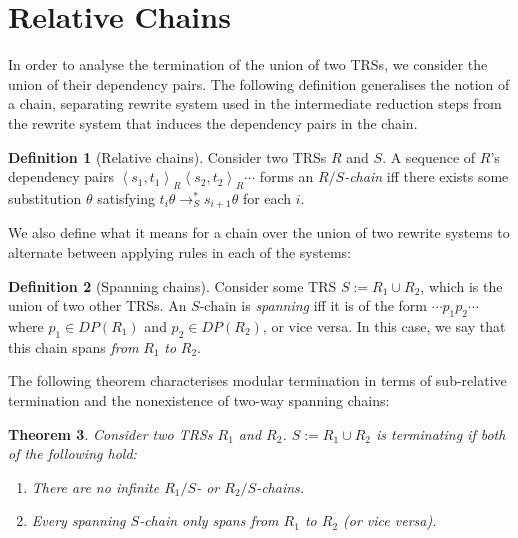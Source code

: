 \documentclass{article}
\newtheorem{theorem}{Theorem}%
\theoremstyle{definition}
\newtheorem{definition}[theorem]{Definition}
\newcommand{\dpair}[2]{\left\langle #1, #2 \right\rangle}
\begin{document}
\section{Relative Chains}

In order to analyse the termination of the union of two TRSs, we consider the union of their dependency pairs. The following definition generalises the notion of a chain, separating rewrite system used in the intermediate reduction steps from the rewrite system that induces the dependency pairs in the chain.

\begin{definition}[Relative chains]
    Consider two TRSs $R$ and $S$. A sequence of $R$'s dependency pairs $\dpair{s_1}{t_1}_R \dpair{s_2}{t_2}_R \cdots$ forms an \emph{$R/S$-chain} iff there exists some substitution $\theta$ satisfying $t_i \theta \rightarrow^*_S s_{i+1}\theta$ for each $i$. 
\end{definition}

We also define what it means for a chain over the union of two rewrite systems to alternate between applying rules in each of the systems:
\begin{definition}[Spanning chains]
    Consider some TRS $S := R_1 \cup R_2$, which is the union of two other TRSs. An $S$-chain is \emph{spanning} iff it is of the form $\cdots p_1 p_2 \cdots$ where $p_1 \in DP(R_1)$ and $p_2 \in DP(R_2)$, or vice versa. In this case, we say that this chain spans \emph{from} $R_1$ \emph{to} $R_2$.
\end{definition}
The following theorem characterises modular termination in terms of sub-relative termination and the nonexistence of two-way spanning chains:
\begin{theorem} \label{thm:mod_span_term}
    Consider two TRSs $R_1$ and $R_2$. $S := R_1 \cup R_2$ is terminating if both of the following hold: \begin{enumerate}
        \item There are no infinite $R_1/S$- or $R_2/S$-chains. \label{cond:no_r_chains}
        \item Every spanning $S$-chain only spans from $R_1$ to $R_2$ (or vice versa). \label{cond:no_span_chains}
    \end{enumerate}
\end{theorem}
\end{document}
